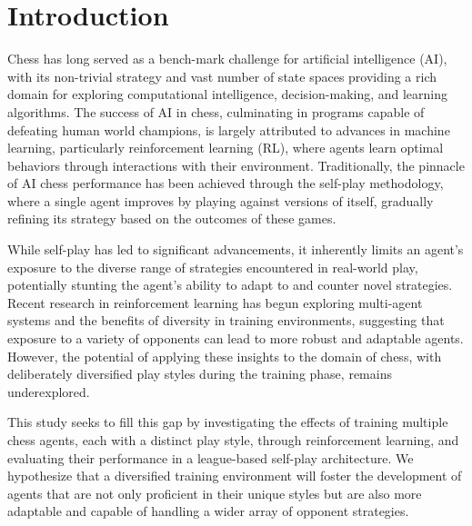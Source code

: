 \documentclass[journal]{IEEEtran}
\begin{document}
	\section{Introduction}
	\label{sec:introduction}
	Chess has long served as a bench-mark challenge for artificial intelligence (AI),
	with its non-trivial strategy and vast number of state spaces providing a rich domain for exploring 
	computational intelligence, decision-making, and learning algorithms. 
	The success of AI in chess, culminating in programs capable of defeating human world champions, 
	is largely attributed to advances in machine learning, particularly reinforcement learning (RL), 
	where agents learn optimal behaviors through interactions with their environment. 
	Traditionally, the pinnacle of AI chess performance has been achieved through the self-play methodology, 
	where a single agent improves by playing against versions of itself, gradually refining its strategy based on the outcomes of these games.
	
	While self-play has led to significant advancements, it inherently limits an agent's exposure to the diverse range of strategies 
	encountered in real-world play, potentially stunting the agent's ability to adapt to and counter novel strategies. 
	Recent research in reinforcement learning has begun exploring multi-agent systems and the benefits of diversity in training environments, 
	suggesting that exposure to a variety of opponents can lead to more robust and adaptable agents. 
	However, the potential of applying these insights to the domain of chess, 
	with deliberately diversified play styles during the training phase, remains underexplored.
		
	This study seeks to fill this gap by investigating the effects of training multiple chess agents, each with a distinct play style, 
	through reinforcement learning, and evaluating their performance in a league-based self-play architecture. 
	We hypothesize that a diversified training environment will foster the development of agents that are not only 
	proficient in their unique styles but are also more adaptable and capable of handling a wider array of opponent strategies. 
		
\end{document}
